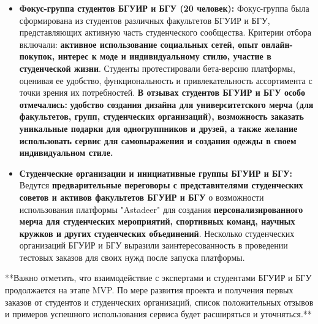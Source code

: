 \begin{itemize}
\begin{itemize}
            \item \textbf{Фокус-группа студентов БГУИР и БГУ (20 человек):}  Фокус-группа была сформирована из студентов различных факультетов БГУИР и БГУ, представляющих активную часть студенческого сообщества.  Критерии отбора включали: \textbf{активное использование социальных сетей, опыт онлайн-покупок, интерес к моде и индивидуальному стилю, участие в студенческой жизни}.  Студенты протестировали бета-версию платформы, оценивая ее удобство, функциональность и привлекательность ассортимента с точки зрения их потребностей. \textbf{В отзывах студентов БГУИР и БГУ особо отмечались:}  \textbf{удобство создания дизайна для университетского мерча (для факультетов, групп, студенческих организаций), возможность заказать уникальные подарки для одногруппников и друзей, а также желание использовать сервис для самовыражения и создания одежды в своем индивидуальном стиле.}
            \item \textbf{Студенческие организации и инициативные группы БГУИР и БГУ:}  Ведутся \textbf{предварительные переговоры с представителями студенческих советов и активов факультетов БГУИР и БГУ}  о возможности использования платформы "Astadeer" для создания \textbf{персонализированного мерча для студенческих мероприятий, спортивных команд, научных кружков и других студенческих объединений}.  Несколько студенческих организаций БГУИР и БГУ выразили заинтересованность в проведении тестовых заказов для своих нужд после запуска платформы.
        \end{itemize}
\end{itemize}

\vspace{0.3cm}

**Важно отметить, что взаимодействие с экспертами и студентами БГУИР и БГУ продолжается на этапе MVP.  По мере развития проекта и получения первых заказов от студентов и студенческих организаций, список положительных отзывов и примеров успешного использования сервиса будет расширяться и уточняться.**
